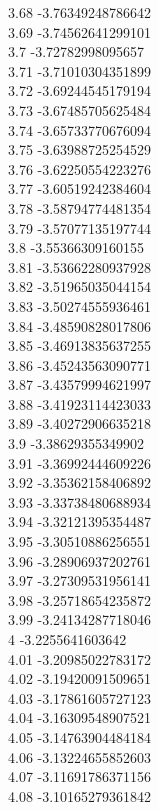 {3.68	-3.76349248786642\\
3.69	-3.74562641299101\\
3.7	-3.72782998095657\\
3.71	-3.71010304351899\\
3.72	-3.69244545179194\\
3.73	-3.67485705625484\\
3.74	-3.65733770676094\\
3.75	-3.63988725254529\\
3.76	-3.62250554223276\\
3.77	-3.60519242384604\\
3.78	-3.58794774481354\\
3.79	-3.57077135197744\\
3.8	-3.55366309160155\\
3.81	-3.53662280937928\\
3.82	-3.51965035044154\\
3.83	-3.50274555936461\\
3.84	-3.48590828017806\\
3.85	-3.46913835637255\\
3.86	-3.45243563090771\\
3.87	-3.43579994621997\\
3.88	-3.41923114423033\\
3.89	-3.40272906635218\\
3.9	-3.38629355349902\\
3.91	-3.36992444609226\\
3.92	-3.35362158406892\\
3.93	-3.33738480688934\\
3.94	-3.32121395354487\\
3.95	-3.30510886256551\\
3.96	-3.28906937202761\\
3.97	-3.27309531956141\\
3.98	-3.25718654235872\\
3.99	-3.24134287718046\\
4	-3.2255641603642\\
4.01	-3.20985022783172\\
4.02	-3.19420091509651\\
4.03	-3.17861605727123\\
4.04	-3.16309548907521\\
4.05	-3.14763904484184\\
4.06	-3.13224655852603\\
4.07	-3.11691786371156\\
4.08	-3.10165279361842\\
}
